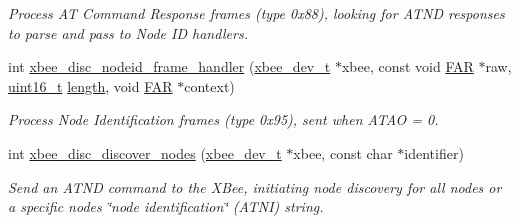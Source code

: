 \begin{DoxyCompactItemize}
\begin{DoxyCompactList}\small\item\em Process AT Command Response frames (type 0x88), looking for A\+T\+ND responses to parse and pass to Node ID handlers. \end{DoxyCompactList}\item 
int \hyperlink{group__xbee__discovery_gac15854e05ef3f80d6ddae653065c0a40}{xbee\+\_\+disc\+\_\+nodeid\+\_\+frame\+\_\+handler} (\hyperlink{structxbee__dev__t}{xbee\+\_\+dev\+\_\+t} $\ast$xbee, const void \hyperlink{group__hal_gaef060b3456fdcc093a7210a762d5f2ed}{F\+AR} $\ast$raw, \hyperlink{group__hal__dos_ga5a8b2dc9e45a9ee81a94ef304fb62505}{uint16\+\_\+t} \hyperlink{group__zdo_gab2b3adeb2a67e656ff030b56727fd0ac}{length}, void \hyperlink{group__hal_gaef060b3456fdcc093a7210a762d5f2ed}{F\+AR} $\ast$context)
\begin{DoxyCompactList}\small\item\em Process Node Identification frames (type 0x95), sent when A\+T\+AO = 0. \end{DoxyCompactList}\item 
int \hyperlink{group__xbee__discovery_ga12d6a10c8348cf5eb9636bbf02420dd3}{xbee\+\_\+disc\+\_\+discover\+\_\+nodes} (\hyperlink{structxbee__dev__t}{xbee\+\_\+dev\+\_\+t} $\ast$xbee, const char $\ast$identifier)
\begin{DoxyCompactList}\small\item\em Send an A\+T\+ND command to the X\+Bee, initiating node discovery for all nodes or a specific node\textquotesingle{}s \char`\"{}node identification\char`\"{} (A\+T\+NI) string. \end{DoxyCompactList}\end{DoxyCompactItemize}
